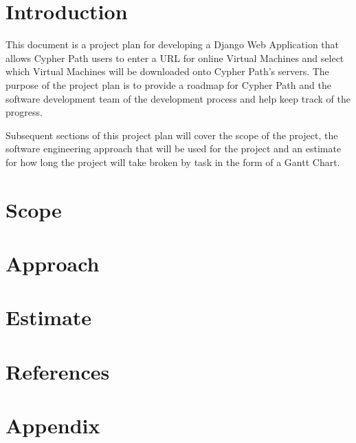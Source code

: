 \documentclass{article}
\title{}
\author{}
\date{}
\begin{document}
    

    \tableofcontents
    \listoffigures

    \newpage
    \begin{versionhistory}
    \end{versionhistory}
    \newpage


    \section{Introduction}
    This document is a project plan for developing a Django Web Application that allows Cypher Path users to enter
    a URL for online Virtual Machines and select which Virtual Machines will be downloaded onto Cypher Path's 
    servers. The purpose of the project plan is to provide a roadmap for Cypher Path and the software development
    team of the development process and help keep track of the progress.

    Subsequent sections of this project plan will cover the scope of the project, the software engineering
    approach that will be used for the project and an estimate for how long the project will take broken by task
    in the form of a Gantt Chart.

    \section{Scope}

    \section{Approach}

    \section{Estimate}

    \section{References}

    \appendix
    \section{Appendix}
\end{document}
